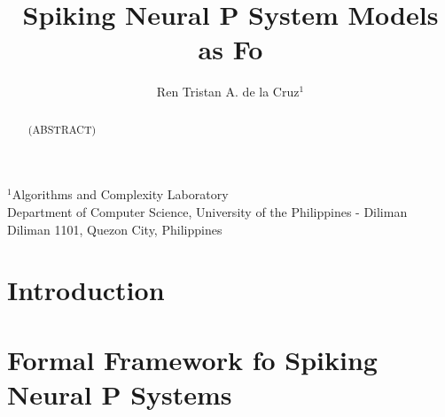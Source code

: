 \documentclass[a4paper]{article}
\begin{document}
\mainmatter

\title
{
Spiking Neural P System Models as Fo
}


\author
{
Ren Tristan A. de la Cruz$^1$
}



\institute
{
$^1$Algorithms and Complexity Laboratory \\
Department of Computer Science, University of the Philippines - Diliman\\
Diliman 1101, Quezon City, Philippines    \\
}

\newcommand{\ra}{\rightarrow}



\maketitle


\begin{abstract}

(ABSTRACT)

\end{abstract}


\section{Introduction}



\section{Formal Framework fo Spiking Neural P Systems} \label{s-ff}
\end{document}
